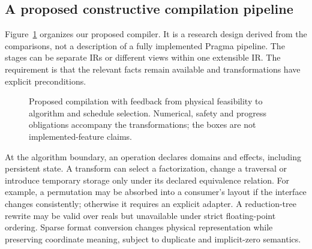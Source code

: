 \documentclass[final,3p,times,authoryear]{elsarticle}
\providecommand{\Description}[1]{}
\begin{document}
\subsection{A proposed constructive compilation pipeline}
Figure~\ref{fig:design} organizes our proposed compiler. It is a research design derived from the comparisons, not a description of a fully implemented Pragma pipeline. The stages can be separate IRs or different views within one extensible IR. The requirement is that the relevant facts remain available and transformations have explicit preconditions.

\begin{figure}[t]
\centering
{}
\caption{Proposed compilation with feedback from physical feasibility to algorithm and schedule selection. Numerical, safety and progress obligations accompany the transformations; the boxes are not implemented-feature claims.}
\Description{Four stages run from the algorithm contract through alternatives and a physical plan to a target implementation. An arrow returns a failed physical plan to the alternatives stage.}
\label{fig:design}
\end{figure}

At the algorithm boundary, an operation declares domains and effects, including persistent state. A transform can select a factorization, change a traversal or introduce temporary storage only under its declared equivalence relation. For example, a permutation may be absorbed into a consumer's layout if the interface changes consistently; otherwise it requires an explicit adapter. A reduction-tree rewrite may be valid over reals but unavailable under strict floating-point ordering. Sparse format conversion changes physical representation while preserving coordinate meaning, subject to duplicate and implicit-zero semantics.
\end{document}
